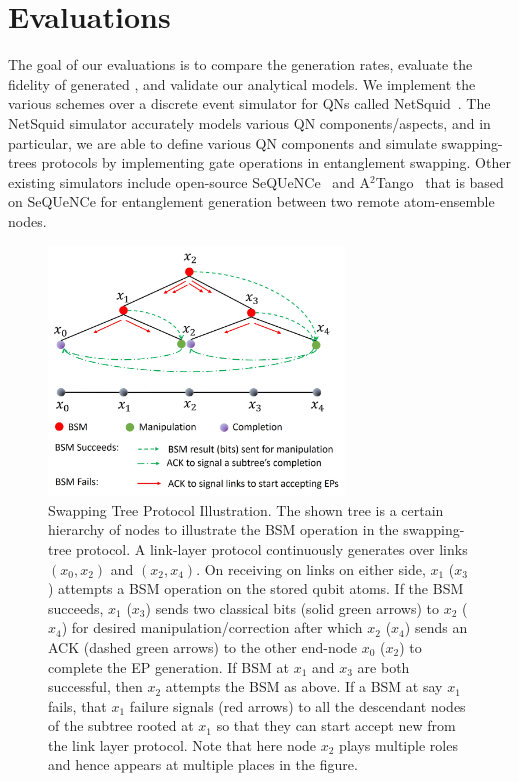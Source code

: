 \section{Evaluations}
\label{sec:swapping_eval}

The goal of our evaluations is to compare the \eps generation rates, evaluate
the fidelity of generated \epss, and validate our analytical models.
We implement the various schemes over a discrete event simulator 
for QNs called NetSquid~\cite{netsquid2020}. 
The NetSquid simulator accurately models various QN components/aspects, and
in particular, we are able to define various QN components and simulate swapping-trees protocols
by implementing gate operations in entanglement swapping.
Other existing simulators include open-source SeQUeNCe~\cite{sequence} and A$^2$Tango~\cite{ruilin2023} 
that is based on SeQUeNCe for entanglement generation between two remote atom-ensemble nodes.


\begin{figure}[ht]
    \centering
    \includegraphics[width=0.7\textwidth]{chapters/tqe/figures/protocol.jpg}
  \caption{Swapping Tree Protocol Illustration.
  The shown tree is a certain hierarchy of nodes to illustrate the BSM operation in the swapping-tree protocol.  
  A link-layer protocol continuously generates \epss over links $(x_0, x_2)$ and $(x_2, x_4)$.
  On receiving \eps on links on either side, $x_1$ ($x_3$) attempts a BSM operation on the stored
  qubit atoms. If the BSM succeeds, $x_1$ ($x_3$) sends two classical bits (solid green arrows) to  $x_2$ ($x_4$) 
  for desired manipulation/correction after which $x_2$ ($x_4$) sends an ACK (dashed green arrows) to the other end-node $x_0$ ($x_2$) to complete the EP generation. If 
  BSM  at  $x_1$ and $x_3$ are both successful, then $x_2$ attempts the BSM as above. 
  If a BSM at say $x_1$ fails, that $x_1$ failure signals (red arrows) to all the descendant nodes of the subtree
  rooted at $x_1$ so that they can start accept new \epss from the link layer protocol. 
  Note that here node $x_2$ plays multiple roles and hence appears at multiple places in the figure.}
  \label{fig:swapping_protocol}
\end{figure}


